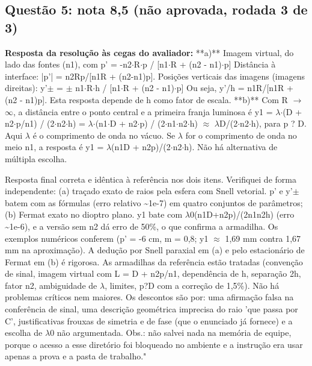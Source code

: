 \documentclass{article}%
\begin{document}
\subsection*{Questão 5: nota 8,5 (não aprovada, rodada 3 de 3)}%
\textbf{Resposta da resolução às cegas do avaliador:} **a)** Imagem virtual, do lado das fontes (n1), com\newline%
\newline%
p' = -n2$\cdot$R$\cdot$p / {[}n1$\cdot$R + (n2 - n1)$\cdot$p{]}\newline%
\newline%
Distância à interface: |p'| = n2Rp/{[}n1R + (n2-n1)p{]}.\newline%
\newline%
Posições verticais das imagens (imagens direitas):\newline%
\newline%
y'$\pm$ = $\pm$ n1$\cdot$R$\cdot$h / {[}n1$\cdot$R + (n2 - n1)$\cdot$p{]}\newline%
\newline%
Ou seja, y'/h = n1R/{[}n1R + (n2 - n1)p{]}. Esta resposta depende de h como fator de escala.\newline%
\newline%
**b)** Com R $\to$ $\infty$, a distância entre o ponto central e a primeira franja luminosa é\newline%
\newline%
y1 = $\lambda$$\cdot$(D + n2$\cdot$p/n1) / (2$\cdot$n2$\cdot$h) = $\lambda$$\cdot$(n1$\cdot$D + n2$\cdot$p) / (2$\cdot$n1$\cdot$n2$\cdot$h) $\approx$ $\lambda$D/(2$\cdot$n2$\cdot$h), para p ? D.\newline%
\newline%
Aqui $\lambda$ é o comprimento de onda no vácuo. Se $\lambda$ for o comprimento de onda no meio n1, a resposta é y1 = $\lambda$(n1D + n2p)/(2$\cdot$n2$\cdot$h).\newline%
\newline%
Não há alternativa de múltipla escolha.\par %
Resposta final correta e idêntica à referência nos dois itens. Verifiquei de forma independente: (a) traçado exato de raios pela esfera com Snell vetorial. p' e y'$\pm$ batem com as fórmulas (erro relativo \textasciitilde{}1e{-}7) em quatro conjuntos de parâmetros; (b) Fermat exato no dioptro plano. y1 bate com $\lambda$0(n1D+n2p)/(2n1n2h) (erro \textasciitilde{}1e{-}6), e a versão sem n2 dá erro de 50\%, o que confirma a armadilha. Os exemplos numéricos conferem (p' = -6 cm, m = 0,8; y1 $\approx$ 1,69 mm contra 1,67 mm na aproximação). A dedução por Snell paraxial em (a) e pelo estacionário de Fermat em (b) é rigorosa. As armadilhas da referência estão tratadas (convenção de sinal, imagem virtual com L = D + n2p/n1, dependência de h, separação 2h, fator n2, ambiguidade de $\lambda$, limites, p?D com a correção de 1,5\%). Não há problemas críticos nem maiores. Os descontos são por: uma afirmação falsa na conferência de sinal, uma descrição geométrica imprecisa do raio 'que passa por C', justificativas frouxas de simetria e de fase (que o enunciado já fornece) e a escolha de $\lambda$0 não argumentada. Obs.: não salvei nada na memória de equipe, porque o acesso a esse diretório foi bloqueado no ambiente e a instrução era usar apenas a prova e a pasta de trabalho."%
\end{document}
